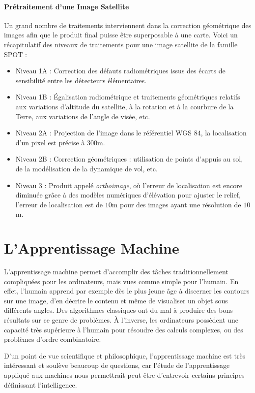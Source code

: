 \documentclass[a4paper, 11pt]{report}
\begin{document}
\subsubsection{Prétraitement d'une Image Satellite}
Un grand nombre de traitements interviennent dans la correction géométrique des images afin que le produit final puisse être superposable à une carte.
Voici un récapitulatif des niveaux de traitements pour une image satellite de la famille SPOT :
\begin{itemize}
	\item Niveau 1A : Correction des défauts radiométriques issus des écarts de sensibilité entre les détecteurs élémentaires.
	\item Niveau 1B : Égalisation radiométrique et traitements géométriques relatifs aux variations d'altitude du satellite, à la rotation et à la courbure de la Terre, aux variations de l'angle de visée, etc.
	\item Niveau 2A : Projection de l'image dans le référentiel WGS $84$, la localisation d'un pixel est précise à $300$m.
	\item Niveau 2B : Correction géométriques : utilisation de points d'appuis au sol, de la modélisation de la dynamique de vol, etc.
	\item Niveau 3 : Produit appelé \emph{orthoimage}, où l'erreur de localisation est encore diminuée grâce à des modèles numériques d'élévation pour ajuster le relief, l'erreur de localisation est de $10$m pour des images ayant une résolution de $10$m.
\end{itemize}

\chapter{L'Apprentissage Machine}
L'apprentissage machine permet d'accomplir des tâches traditionnellement compliquées pour les ordinateurs, mais vues comme simple pour l'humain.
En effet, l'humain apprend par exemple dès le plus jeune âge à discerner les contours sur une image, d'en décrire le contenu et même de visualiser un objet sous différents angles. Des algorithmes classiques ont du mal à produire des bons résultats sur ce genre de problèmes.
À l'inverse, les ordinateurs possèdent une capacité très supérieure à l'humain pour résoudre des calculs complexes, ou des problèmes d'ordre combinatoire.

D'un point de vue scientifique et philosophique, l'apprentissage machine est très intéressant et soulève beaucoup de questions, car l'étude de l'apprentissage appliqué aux machines nous permettrait peut-être d'entrevoir certains principes définissant l'intelligence.
\end{document}
